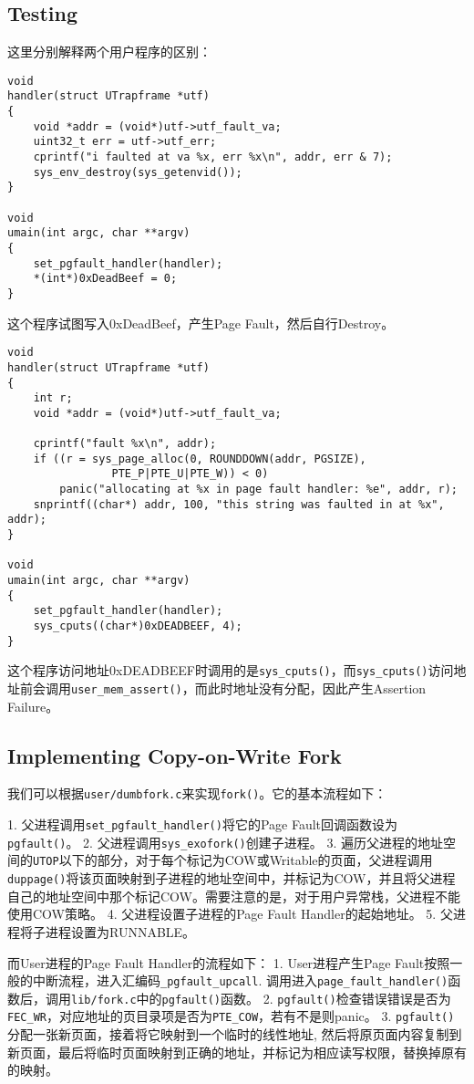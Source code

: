 \documentclass[11pt]{article}
\begin{document}
\subsection{Testing}
这里分别解释两个用户程序的区别：

\begin{lstlisting}[title=user/faultdie.c]
void
handler(struct UTrapframe *utf)
{
	void *addr = (void*)utf->utf_fault_va;
	uint32_t err = utf->utf_err;
	cprintf("i faulted at va %x, err %x\n", addr, err & 7);
	sys_env_destroy(sys_getenvid());
}

void
umain(int argc, char **argv)
{
	set_pgfault_handler(handler);
	*(int*)0xDeadBeef = 0;
}
\end{lstlisting}
这个程序试图写入0xDeadBeef，产生Page Fault，然后自行Destroy。

\begin{lstlisting}[title=user/faultallocbad.c]
void
handler(struct UTrapframe *utf)
{
	int r;
	void *addr = (void*)utf->utf_fault_va;

	cprintf("fault %x\n", addr);
	if ((r = sys_page_alloc(0, ROUNDDOWN(addr, PGSIZE),
				PTE_P|PTE_U|PTE_W)) < 0)
		panic("allocating at %x in page fault handler: %e", addr, r);
	snprintf((char*) addr, 100, "this string was faulted in at %x", addr);
}

void
umain(int argc, char **argv)
{
	set_pgfault_handler(handler);
	sys_cputs((char*)0xDEADBEEF, 4);
}
\end{lstlisting}
这个程序访问地址0xDEADBEEF时调用的是\lstinline|sys_cputs()|，而\lstinline|sys_cputs()|访问地址前会调用\lstinline|user_mem_assert()|，而此时地址没有分配，因此产生Assertion Failure。 

\subsection{Implementing Copy-on-Write Fork}
我们可以根据\lstinline|user/dumbfork.c|来实现\lstinline|fork()|。它的基本流程如下：

1. 父进程调用\lstinline|set_pgfault_handler()|将它的Page Fault回调函数设为\lstinline|pgfault()|。
2. 父进程调用\lstinline|sys_exofork()|创建子进程。
3. 遍历父进程的地址空间的\lstinline|UTOP|以下的部分，对于每个标记为COW或Writable的页面，父进程调用\lstinline|duppage()|将该页面映射到子进程的地址空间中，并标记为COW，并且将父进程自己的地址空间中那个标记COW。需要注意的是，对于用户异常栈，父进程不能使用COW策略。
4. 父进程设置子进程的Page Fault Handler的起始地址。 
5. 父进程将子进程设置为RUNNABLE。

而User进程的Page Fault Handler的流程如下：
1. User进程产生Page Fault按照一般的中断流程，进入汇编码\lstinline|_pgfault_upcall|. 调用进入\lstinline|page_fault_handler()|函数后，调用\lstinline|lib/fork.c|中的\lstinline|pgfault()|函数。
2. \lstinline|pgfault()|检查错误错误是否为\lstinline|FEC_WR|，对应地址的页目录项是否为\lstinline|PTE_COW|，若有不是则panic。 
3. \lstinline|pgfault()|分配一张新页面，接着将它映射到一个临时的线性地址, 然后将原页面内容复制到新页面，最后将临时页面映射到正确的地址，并标记为相应读写权限，替换掉原有的映射。 
\end{document}
